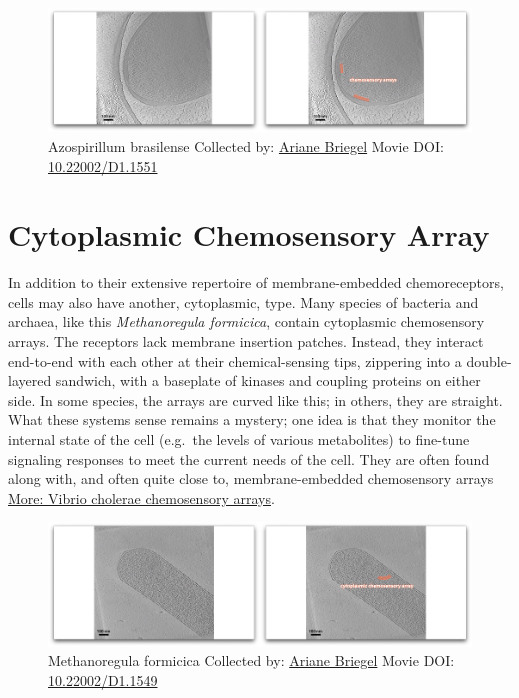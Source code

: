 \documentclass[]{tufte-book}
\begin{document}
\begin{figure}
\includegraphics{movie_stills/7_4a} \caption[Azospirillum brasilense Collected by:
\protect\hyperlink{ariane_briegel}{Ariane Briegel} Movie DOI:
\href{https://doi.org/10.22002/D1.1551}{10.22002/D1.1551}]{Azospirillum brasilense Collected by:
\protect\hyperlink{ariane_briegel}{Ariane Briegel} Movie DOI:
\href{https://doi.org/10.22002/D1.1551}{10.22002/D1.1551}}\label{fig:7-4a}
\end{figure}

\section{Cytoplasmic Chemosensory
Array}\label{cytoplasmic-chemosensory-array}

In addition to their extensive repertoire of membrane-embedded
chemoreceptors, cells may also have another, cytoplasmic, type. Many
species of bacteria and archaea, like this \emph{Methanoregula
formicica}, contain cytoplasmic chemosensory arrays. The receptors lack
membrane insertion patches. Instead, they interact end-to-end with each
other at their chemical-sensing tips, zippering into a double-layered
sandwich, with a baseplate of kinases and coupling proteins on either
side. In some species, the arrays are curved like this; in others, they
are straight. What these systems sense remains a mystery; one idea is
that they monitor the internal state of the cell (e.g.~the levels of
various metabolites) to fine-tune signaling responses to meet the
current needs of the cell. They are often found along with, and often
quite close to, membrane-embedded chemosensory arrays
\protect\hyperlink{Vibrio_cholerae_chemosensory_arrays}{More: Vibrio
cholerae chemosensory arrays}.





\begin{figure}
\includegraphics{movie_stills/7_5} \caption[Methanoregula formicica Collected by:
\protect\hyperlink{ariane_briegel}{Ariane Briegel} Movie DOI:
\href{https://doi.org/10.22002/D1.1549}{10.22002/D1.1549}]{Methanoregula formicica Collected by:
\protect\hyperlink{ariane_briegel}{Ariane Briegel} Movie DOI:
\href{https://doi.org/10.22002/D1.1549}{10.22002/D1.1549}}\label{fig:7-5}
\end{figure}
\end{document}
